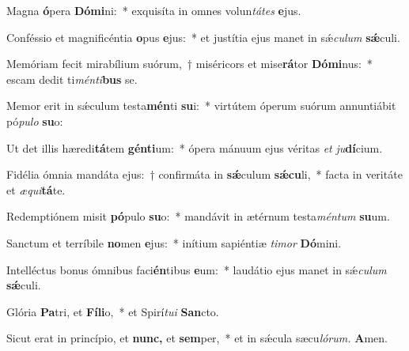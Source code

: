 \item Magna \textbf{ó}pera \textbf{Dó}\textbf{mi}ni:~* exquisíta in omnes volun\textit{tátes} \textbf{e}jus.
\item Conféssio et magnificéntia \textbf{o}pus \textbf{e}jus:~* et justítia ejus manet in sǽ\tinyhspace\textit{culum} \textbf{sǽ}culi.
\item Memóriam fecit mirabílium suórum,~† miséricors et mise\textbf{rá}tor \textbf{Dó}\textbf{mi}nus:~* escam dedit ti\textit{ménti}\textbf{bus} se.
\item Memor erit in sǽculum testa\textbf{mén}ti \textbf{su}i:~* virtútem óperum suórum annuntiábit pó\textit{pulo} \textbf{su}o:
\item Ut det illis hæredi\textbf{tá}tem \textbf{gén}\textbf{ti}um:~* ópera mánuum ejus véritas \textit{et} \textit{ju}\textbf{dí}cium.
\item Fidélia ómnia mandáta ejus:~† confirmáta in \textbf{sǽ}culum \textbf{sǽ}\textbf{cu}li,~* facta in veritáte et \textit{æqui}\textbf{tá}te.
\item Redemptiónem misit \textbf{pó}pulo \textbf{su}o:~* mandávit in ætérnum testa\textit{méntum} \textbf{su}um.
\item Sanctum et terríbile \textbf{no}men \textbf{e}jus:~* inítium sapiéntiæ \textit{timor} \textbf{Dó}mini.
\item Intelléctus bonus ómnibus faci\textbf{én}tibus \textbf{e}um:~* laudátio ejus manet in sǽ\textit{culum} \textbf{sǽ}culi.
\item Glória \textbf{Pa}tri, et \textbf{Fíli}o,~* et Spirí\tinyhspace\textit{tui} \textbf{San}cto.
\item Sicut erat in princípio, et \textbf{nunc,} et \textbf{sem}per,~* et in sǽcula sæcu\tinyhspace\textit{lórum.} \textbf{A}men.